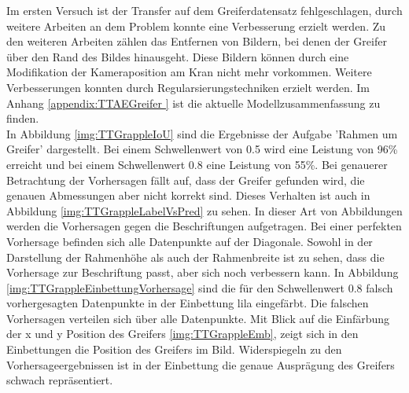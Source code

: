  	Im ersten Versuch ist der Transfer auf dem Greiferdatensatz fehlgeschlagen, durch weitere Arbeiten an dem Problem konnte eine Verbesserung erzielt werden. Zu den weiteren Arbeiten zählen das Entfernen von Bildern, bei denen der Greifer über den Rand des Bildes hinausgeht. Diese Bildern können durch eine Modifikation der Kameraposition am Kran nicht mehr vorkommen. Weitere Verbesserungen konnten durch Regularsierungstechniken erzielt werden. Im Anhang \ref{appendix:TTAEGreifer } ist die aktuelle Modellzusammenfassung zu finden. \\
 	In Abbildung \ref{img:TTGrappleIoU} sind die Ergebnisse der Aufgabe 'Rahmen um Greifer' dargestellt. Bei einem Schwellenwert von 0.5 wird eine Leistung von 96\% erreicht und bei einem Schwellenwert 0.8 eine Leistung von 55\%. Bei genauerer Betrachtung der Vorhersagen fällt auf, dass der Greifer gefunden wird, die genauen Abmessungen aber nicht korrekt sind. Dieses Verhalten ist auch in Abbildung \ref{img:TTGrappleLabelVsPred} zu sehen. In dieser Art von Abbildungen werden die Vorhersagen gegen die Beschriftungen aufgetragen. Bei einer perfekten Vorhersage befinden sich alle Datenpunkte auf der Diagonale. Sowohl in der Darstellung der Rahmenhöhe als auch der Rahmenbreite ist zu sehen, dass die Vorhersage zur Beschriftung passt, aber sich noch verbessern kann. In Abbildung \ref{img:TTGrappleEinbettungVorhersage} sind die für den Schwellenwert 0.8 falsch vorhergesagten Datenpunkte in der Einbettung lila eingefärbt. Die falschen Vorhersagen verteilen sich über alle Datenpunkte. Mit Blick auf die Einfärbung der x und y Position des Greifers \ref{img:TTGrappleEmb}, zeigt sich in den Einbettungen die Position des Greifers im Bild. Widerspiegeln zu den Vorhersageergebnissen ist in der Einbettung die genaue Ausprägung des Greifers schwach repräsentiert.
